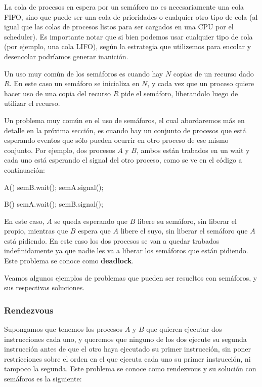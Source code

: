 \documentclass{article}
\begin{document}
La cola de procesos en espera por un sem\'aforo no es necesariamente una cola FIFO, sino que puede ser una cola de prioridades o cualquier otro tipo de cola (al igual que las colas de procesos listos para ser cargados en una CPU por el scheduler). Es importante notar que si bien podemos usar cualquier tipo de cola (por ejemplo, una cola LIFO), seg\'un la estrategia que utilizemos para encolar y desencolar podr\'iamos generar inanici\'on.

Un uso muy com\'un de los sem\'aforos es cuando hay $N$ copias de un recurso dado $R$. En este caso un sem\'aforo se inicializa en $N$, y cada vez que un proceso quiere hacer uso de una copia del recurso $R$ pide el sem\'aforo, liberandolo luego de utilizar el recurso.

Un problema muy com\'un en el uso de sem\'aforos, el cual abordaremos m\'as en detalle en la pr\'oxima secci\'on, es cuando hay un conjunto de procesos que est\'a esperando eventos que s\'olo pueden ocurrir en otro proceso de ese mismo conjunto. Por ejemplo, dos procesos $A$ y $B$, ambos est\'an trabados en un wait y cada uno est\'a esperando el signal del otro proceso, como se ve en el c\'odigo a continuaci\'on:

\begin{code}
A()
{
    semB.wait();
		semA.signal();
}
\end{code}

\begin{code}
B()
{
    semA.wait();
		semB.signal();
}
\end{code}

En este caso, $A$ se queda esperando que $B$ libere su sem\'aforo, sin liberar el propio, mientras que $B$ espera que $A$ libere el suyo, sin liberar el sem\'aforo que $A$ est\'a pidiendo. En este caso los dos procesos se van a quedar trabados indefinidamente ya que nadie les va a liberar los sem\'aforos que est\'an pidiendo. Este problema se conoce como \textbf{deadlock}.

Veamos algunos ejemplos de problemas que pueden ser resueltos con sem\'aforos, y sus respectivas soluciones.

\subsubsection{Rendezvous}

Supongamos que tenemos los procesos $A$ y $B$ que quieren ejecutar dos instrucciones cada uno, y queremos que ninguno de los dos ejecute su segunda instrucci\'on antes de que el otro haya ejecutado su primer instrucci\'on, sin poner restricciones sobre el orden en el que ejecuta cada uno su primer instrucci\'on, ni tampoco la segunda. Este problema se conoce como rendezvous y su soluci\'on con sem\'aforos es la siguiente:
\end{document}
